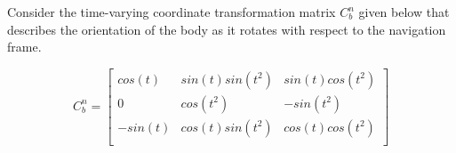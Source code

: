 
\question
Consider the time-varying coordinate transformation matrix $C^n_b$ given below that describes the orientation of the body as it rotates with respect to the navigation frame.

\[C^n_b =
    \begin{bmatrix}
        cos(t)  & sin(t)sin(t^2)  & sin(t)cos(t^2) \\
        0       & cos(t^2)        & -sin(t^2)      \\
        -sin(t) & cos(t) sin(t^2) & cos(t)cos(t^2) \\
    \end{bmatrix} \]

